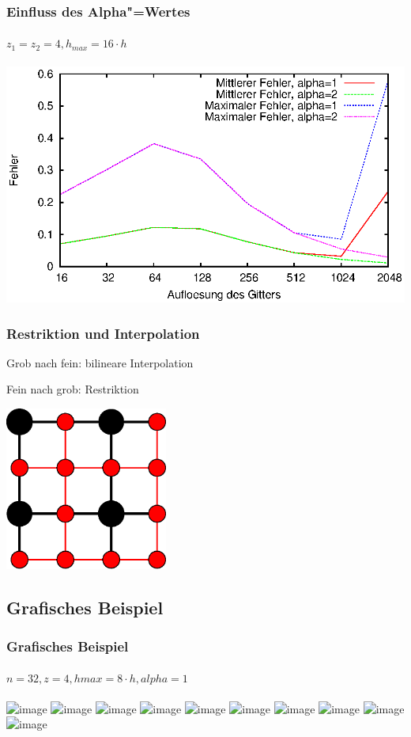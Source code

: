 \documentclass{beamer}
\begin{document}
\begin{frame}
    \frametitle{Einfluss des Alpha"=Wertes}
    \framesubtitle{\(z_1 = z_2 = 4, h_{max} = 16 \cdot h\)}
    \includegraphics[width=\textwidth]{plots/fehlermehrgitter}
\end{frame}

\begin{frame}
    \frametitle{Restriktion und Interpolation}
    Grob nach fein: bilineare Interpolation
    
    Fein nach grob: Restriktion
    \begin{center}
        \includegraphics[width=0.4\textwidth]{interpolation}
    \end{center}
\end{frame}

\subsection{Grafisches Beispiel}
\begin{frame}
    \frametitle{Grafisches Beispiel}
    \framesubtitle{$n=32, z=4, hmax=8 \cdot h, alpha=1$}
    \includegraphics<1>[trim=25 0 25 0, clip, width=\textwidth]{plots/000}
    \includegraphics<2>[trim=25 0 25 0, clip, width=\textwidth]{plots/001}
    \includegraphics<3>[trim=25 0 25 0, clip, width=\textwidth]{plots/002}
    \includegraphics<4>[trim=25 0 25 0, clip, width=\textwidth]{plots/003}
    \includegraphics<5>[trim=25 0 25 0, clip, width=\textwidth]{plots/004}
    \includegraphics<6>[trim=25 0 25 0, clip, width=\textwidth]{plots/005}
    \includegraphics<7>[trim=25 0 25 0, clip, width=\textwidth]{plots/006}
    \includegraphics<8>[trim=25 0 25 0, clip, width=\textwidth]{plots/007}
    \includegraphics<9>[trim=25 0 25 0, clip, width=\textwidth]{plots/008}
    \includegraphics<10>[trim=25 0 25 0, clip, width=\textwidth]{plots/009}
\end{frame}
\end{document}
